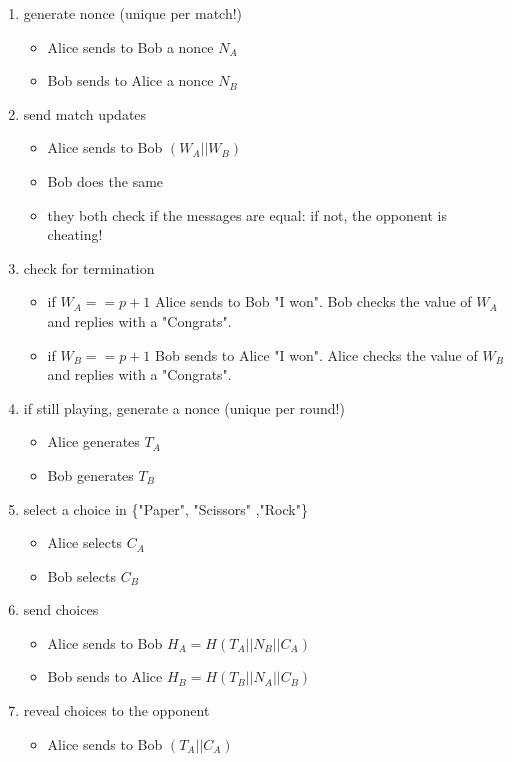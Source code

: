 \documentclass[11 pt]{article}
\begin{document}
\begin{enumerate}
	\item generate nonce (unique per match!)
	\begin{itemize}
		\item Alice sends to Bob a nonce $N_A$
		\item Bob sends to Alice a nonce $N_B$
	\end{itemize}
	\item send match updates
	\begin{itemize}
		\item Alice sends to Bob $(W_A || W_B)$
		\item Bob does the same
		\item they both check if the messages are equal: if not, the opponent is cheating!
	\end{itemize}
	\item check for termination
	\begin{itemize}
		\item if $W_A == p+1$ Alice sends to Bob "I won". Bob checks the value of $W_A$ and replies with a "Congrats".
		\item if $W_B == p+1$ Bob sends to Alice "I won". Alice checks the value of $W_B$ and replies with a "Congrats".
	\end{itemize}
	\item if still playing, generate a nonce (unique per round!)
	\begin{itemize}
		\item Alice generates $T_A$
		\item Bob generates $T_B$
	\end{itemize}
	\item select a choice in \{"Paper", "Scissors" ,"Rock"\}
	\begin{itemize}
		\item Alice selects $C_A$
		\item Bob selects $C_B$
	\end{itemize}
	\item send choices
	\begin{itemize}
		\item Alice sends to Bob $H_A = H( T_A || N_B || C_A )$
		\item Bob sends to Alice $H_B = H( T_B || N_A || C_B )$
	\end{itemize}
	\item reveal choices to the opponent
	\begin{itemize}
		\item Alice sends to Bob $(T_A || C_A)$

\end{itemize}
\end{enumerate}
\end{document}
